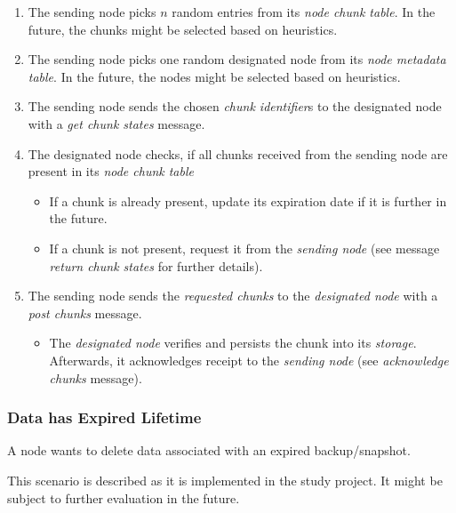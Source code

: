 \begin{enumerate}
    \item The sending node picks $n$ random entries from its \emph{node chunk table}. In the future, the chunks might be selected based on heuristics.
    \item The sending node picks one random designated node from its \emph{node metadata table}. In the future, the nodes might be selected based on heuristics. %
    \item The sending node sends the chosen \emph{chunk identifier}s to the designated node with a \emph{get chunk states} message.
    \item The designated node checks, if all chunks received from the sending node are present in its \emph{node chunk table}
        \begin{itemize}
            \item If a chunk is already present, update its expiration date if it is further in the future.
            \item If a chunk is not present, request it from the \emph{sending node} (see message \emph{return chunk states} for further details).
        \end{itemize}
    \item The sending node sends the \emph{requested chunks} to the \emph{designated node} with a \emph{post chunks} message.
        \begin{itemize}
            \item The \emph{designated node} verifies and persists the chunk into its \emph{storage}. Afterwards, it acknowledges receipt to the \emph{sending node} (see \emph{acknowledge chunks} message).
        \end{itemize}
\end{enumerate}

\subsubsection{Data has Expired Lifetime}\label{sec:scenario-data-expiration}
A node wants to delete data associated with an expired backup/snapshot.

This scenario is described as it is implemented in the study project. It might be subject to further evaluation in the future.

